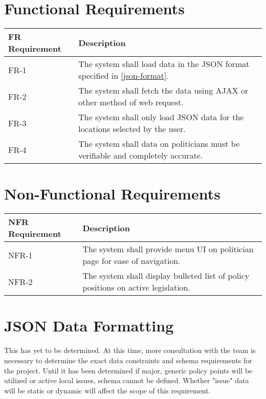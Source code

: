 \documentclass{article}
\newcommand{\requirement}[1]{The system shall #1.}
\begin{document}
\section{Functional Requirements}
\begin{tabu}{lX}
  \toprule
  FR Requirement & Description\\
  \midrule
  FR-1 & \requirement{load data in the JSON format specified in
    \vref{json-format}}\\
  FR-2 & \requirement{fetch the data using AJAX or other method of web request}\\
  FR-3 & \requirement{only load JSON data for the locations selected
    by the user}\\
  FR-4 & \requirement{data on politicians must be verifiable and completely accurate}\\
  \bottomrule
\end{tabu}
\section{Non-Functional Requirements}
\begin{tabu}{lX}
  \toprule
  NFR Requirement & Description\\
  \midrule
  NFR-1 & \requirement{provide menu UI on politician page for ease of navigation}\\
  NFR-2 & \requirement{display bulleted list of policy positions on active legislation}\\
  \bottomrule
\end{tabu}

\section{JSON Data Formatting}
\label{json-format}
This has yet to be determined. At this time, more consultation with the team is necessary to determine the exact data constraints and schema requirements for the project.
Until it has been determined if major, generic policy points will be utilized or active local issues, schema cannot be defined. Whether "issue" data will be static or dynamic
will affect the scope of this requirement.
\end{document}
